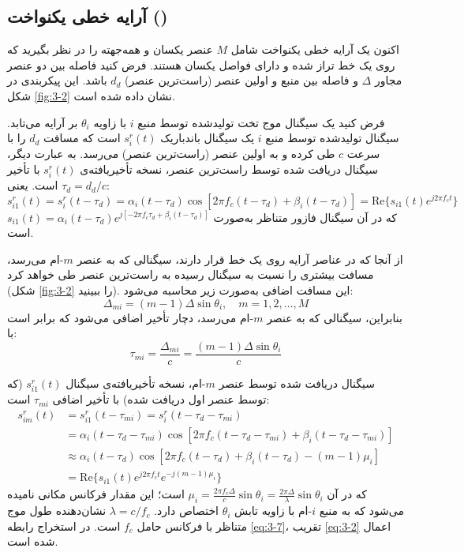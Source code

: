 \subsection{آرایه خطی یکنواخت ()}
\label{subsec:3-2-1}

اکنون یک آرایه خطی یکنواخت شامل $M$ عنصر یکسان و همه‌جهته را در نظر بگیرید که روی یک خط تراز شده و دارای فواصل یکسان هستند. فرض کنید فاصله بین دو عنصر مجاور $\Delta$ و فاصله بین منبع و اولین عنصر (راست‌ترین عنصر) $d_d$ باشد. این پیکربندی در شکل \ref{fig:3-2} نشان داده شده است.

فرض کنید یک سیگنال موج تخت تولیدشده توسط منبع $i$ با زاویه $\theta_i$ بر آرایه می‌تابد. سیگنال تولیدشده توسط منبع $i$ یک سیگنال باندباریک $s_i^r(t)$ است که مسافت $d_d$ را با سرعت $c$ طی کرده \cite{3} و به اولین عنصر (راست‌ترین عنصر) می‌رسد. به عبارت دیگر، سیگنال دریافت شده توسط راست‌ترین عنصر، نسخه تأخیریافته‌ی $s_i^r(t)$ با تأخیر $\tau_d = d_d/c$ است. یعنی:
\begin{equation}
	s_{i1}^r(t) = s_i^r(t-\tau_d) = \alpha_i(t-\tau_d) \cos[2\pi f_c(t-\tau_d) + \beta_i(t-\tau_d)] = \text{Re}\{s_{i1}(t) e^{j2\pi f_c t}\}
	\label{eq:3-4}
\end{equation}
که در آن سیگنال فازور متناظر به‌صورت $s_{i1}(t) = \alpha_i(t-\tau_d) e^{j[-2\pi f_c \tau_d + \beta_i(t-\tau_d)]}$ است.

از آنجا که در  عناصر آرایه روی یک خط قرار دارند، سیگنالی که به عنصر $m$-ام می‌رسد، مسافت بیشتری را نسبت به سیگنال رسیده به راست‌ترین عنصر طی خواهد کرد (شکل \ref{fig:3-2} را ببینید). این مسافت اضافی به‌صورت زیر محاسبه می‌شود:
\begin{equation}
	\Delta_{mi} = (m-1) \Delta \sin \theta_i, \quad m=1, 2, \dots, M
	\label{eq:3-5}
\end{equation}
بنابراین، سیگنالی که به عنصر $m$-ام می‌رسد، دچار تأخیر اضافی می‌شود که برابر است با:
\begin{equation}
	\tau_{mi} = \frac{\Delta_{mi}}{c} = \frac{(m-1) \Delta \sin \theta_i}{c}
	\label{eq:3-6}
\end{equation}

سیگنال دریافت شده توسط عنصر $m$-ام، نسخه تأخیریافته‌ی سیگنال $s_{i1}^r(t)$ (که توسط عنصر اول دریافت شده) با تأخیر اضافی $\tau_{mi}$ است:
\begin{align}
	s_{im}^r(t) &= s_{i1}^r(t-\tau_{mi}) = s_i^r(t-\tau_d-\tau_{mi}) \nonumber \\
	&= \alpha_i(t-\tau_d-\tau_{mi}) \cos[2\pi f_c(t-\tau_d-\tau_{mi}) + \beta_i(t-\tau_d-\tau_{mi})] \nonumber \\
	&\approx \alpha_i(t-\tau_d) \cos[2\pi f_c(t-\tau_d) + \beta_i(t-\tau_d) - (m-1)\mu_i] \nonumber \\
	&= \text{Re}\{s_{i1}(t) e^{j2\pi f_c t} e^{-j(m-1)\mu_i}\}
	\label{eq:3-7}
\end{align}
که در آن $\mu_i = \frac{2\pi f_c \Delta}{c} \sin \theta_i = \frac{2\pi \Delta}{\lambda} \sin \theta_i$ است؛ این مقدار فرکانس مکانی نامیده می‌شود که به منبع $i$-ام با زاویه تابش $\theta_i$ اختصاص دارد. $\lambda = c/f_c$ نشان‌دهنده طول موج متناظر با فرکانس حامل $f_c$ است. در استخراج رابطه \eqref{eq:3-7}، تقریب \eqref{eq:3-2} اعمال شده است.

